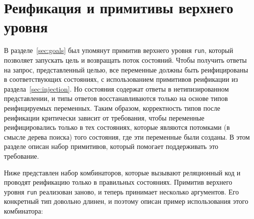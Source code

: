 
\section{Реификация и примитивы верхнего уровня }
\label{sec:reification}


В разделе~\ref{sec:goals} был упомянут примитив верхнего уровня \lstinline|run|, который позволяет запускать цель и возвращать поток состояний.
Чтобы получить ответы на запрос, представленный целью, все переменные должны быть реифицированы в соответствующих состояниях, с использованием примитивов реификации из раздела~\ref{sec:injection}.
Но состояния содержат ответы в нетипизированном представлении, и типы ответов восстанавливаются только на основе типов реифицируемых переменных.
Таким образом, корректность типов после реификации критически зависит от требования, чтобы переменные реифицировались только в тех состояниях, которые являются потомками (в смысле дерева поиска) того состояния, где эти переменные были созданы.
В этом разделе   описан набор примитивов, который помогает поддерживать это требование.


Ниже представлен набор комбинаторов, которые вызывают реляционный код и проводят реификацию только в правильных состояниях.
Примитив верхнего уровня \lstinline|run| реализован заново, и теперь принимает несколько аргументов.
Его конкретный тип довольно длинен, и поэтому описан пример   использования этого комбинатора:

